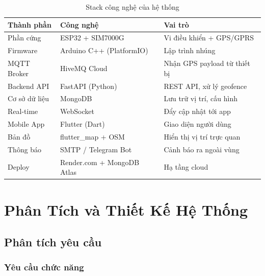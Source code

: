 \documentclass[13pt, a4paper]{report}
\begin{document}
\begin{table}[H]
\centering
\caption{Stack công nghệ của hệ thống}
\label{tab:tech_summary}
\begin{tabularx}{\textwidth}{l l X}
\toprule
\textbf{Thành phần} & \textbf{Công nghệ} & \textbf{Vai trò} \\
\midrule
Phần cứng     & ESP32 + SIM7000G         & Vi điều khiển + GPS/GPRS \\
Firmware      & Arduino C++ (PlatformIO) & Lập trình nhúng \\
MQTT Broker   & HiveMQ Cloud             & Nhận GPS payload từ thiết bị \\
Backend API   & FastAPI (Python)          & REST API, xử lý geofence \\
Cơ sở dữ liệu & MongoDB                 & Lưu trữ vị trí, cấu hình \\
Real-time     & WebSocket                & Đẩy cập nhật tới app \\
Mobile App    & Flutter (Dart)           & Giao diện người dùng \\
Bản đồ        & flutter\_map + OSM       & Hiển thị vị trí trực quan \\
Thông báo     & SMTP / Telegram Bot      & Cảnh báo ra ngoài vùng \\
Deploy        & Render.com + MongoDB Atlas & Hạ tầng cloud \\
\bottomrule
\end{tabularx}
\end{table}

\chapter{Phân Tích và Thiết Kế Hệ Thống}

\section{Phân tích yêu cầu}

\subsection{Yêu cầu chức năng}
\end{document}
